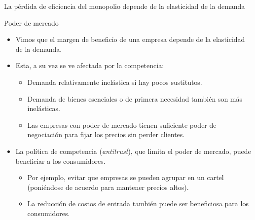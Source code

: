 \documentclass{beamer}
\begin{document}
\begin{frame}{La pérdida de eficiencia del monopolio depende de la elasticidad de la demanda}
    \begin{center}
    \begin{figure}[H]
    \begin{center}
    \end{center}
    \end{figure}
    \end{center}
\end{frame}

\begin{frame}{Poder de mercado}
    \begin{itemize}
        \item Vimos que el margen de beneficio de una empresa depende de la elasticidad de la demanda.
            \item Esta, a su vez se ve afectada por la competencia:     
            \begin{itemize}
            \item Demanda relativamente inelástica si hay pocos sustitutos.
            \item Demanda de bienes esenciales o de primera necesidad también son más inelásticas.
            \item Las empresas con poder de mercado tienen suficiente poder de negociación para fijar los precios sin perder clientes.
        \end{itemize}
        \item La política de competencia (\textit{antitrust}), que limita el poder de mercado, puede beneficiar a los consumidores. 
        \begin{itemize}
            \item Por ejemplo, evitar que empresas se pueden agrupar en un cartel (poniéndose de acuerdo para mantener precios altos).
            \item La reducción de costos de entrada también puede ser beneficiosa para los consumidores.
        \end{itemize}
    \end{itemize}
\end{frame}
\end{document}
